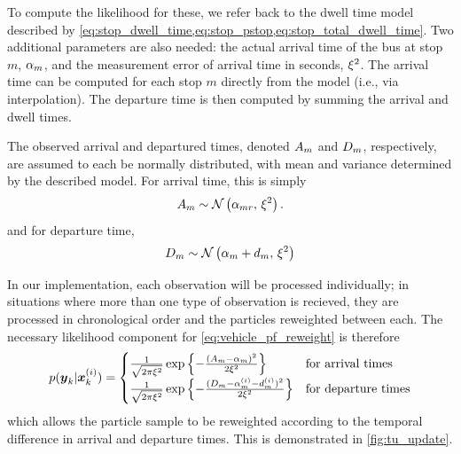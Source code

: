 To compute the likelihood for these, we refer back to the dwell time model described by \cref{eq:stop_dwell_time,eq:stop_pstop,eq:stop_total_dwell_time}. Two additional parameters are also needed: the actual arrival time of the bus at stop $m$, $\alpha_{m}$, and the measurement error of arrival time in seconds, $\xi^2$. The arrival time can be computed for each stop $m$ directly from the model (i.e., via interpolation). The departure time is then computed by summing the arrival and dwell times.


The observed arrival and departured times, denoted $A_m$ and $D_m$, respectively, are assumed to each be normally distributed, with mean and variance determined by the described model. For arrival time, this is simply
\begin{equation}
\label{eq:tu_arr_lhood}
A_m \sim \mathcal{N}\left(\alpha_{mr},\, \xi^2\right).
\end{equation}
and for departure time,
\begin{equation}
\label{eq:tu_dep_lhood}
D_m \sim \mathcal{N}\left(\alpha_m + d_m,\, \xi^2\right)
\end{equation}


In our \pf{} implementation, each observation will be processed individually; in situations where more than one type of observation is recieved, they are processed in chronological order and the particles reweighted between each. The necessary likelihood component for \cref{eq:vehicle_pf_reweight} is therefore
\begin{equation}
\label{eq:tu_obs_lhood}
p(\boldsymbol{y}_k | \boldsymbol x^{(i)}_k) =
\begin{cases}
\frac{1}{\sqrt{2\pi\xi^2}}
    \exp\left\{
        -\frac{(A_m - \alpha_m)^2}{2\xi^2}
    \right\} & \text{for arrival times} \\
\frac{1}{\sqrt{2\pi\xi^2}}
    \exp\left\{
        -\frac{(D_m - \alpha^{(i)}_m - d^{(i)}_m)^2}{2\xi^2}
    \right\} & \text{for departure times}
\end{cases}
\end{equation}
which allows the particle sample to be reweighted according to the temporal difference in arrival and departure times. This is demonstrated in \cref{fig:tu_update}.

